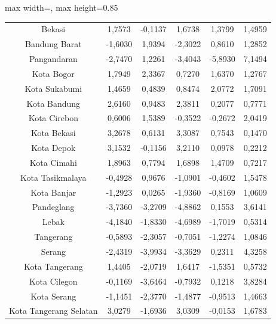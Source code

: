 \begin{table}[H]
\begin{adjustbox}{max width=\textwidth, max height=0.85\textheight}
\begin{tabular}{|c|c|c|c|c|c|}
Bekasi & 1,7573 & -0,1137 & 1,6738 & 1,3799 & 1,4959 \\
Bandung Barat & -1,6030 & 1,9394 & -2,3022 & 0,8610 & 1,2852 \\
Pangandaran & -2,7470 & 1,2261 & -3,4043 & -5,8930 & 7,1494 \\
Kota Bogor & 1,7949 & 2,3367 & 0,7270 & 1,6370 & 1,2767 \\
Kota Sukabumi & 1,4659 & 0,4839 & 0,8474 & 2,0772 & 1,7091 \\
Kota Bandung & 2,6160 & 0,9483 & 2,3811 & 0,2077 & 0,7771 \\
Kota Cirebon & 0,6006 & 1,5389 & -0,3522 & -0,2672 & 2,0419 \\
Kota Bekasi & 3,2678 & 0,6131 & 3,3087 & 0,7543 & 0,1470 \\
Kota Depok & 3,1532 & -0,1156 & 3,2110 & 0,0978 & 0,2212 \\
Kota Cimahi & 1,8963 & 0,7794 & 1,6898 & 1,4709 & 0,7217 \\
Kota Tasikmalaya & -0,4928 & 0,9676 & -1,0901 & -0,4602 & 1,5478 \\
Kota Banjar & -1,2923 & 0,0265 & -1,9360 & -0,8169 & 1,0609 \\
Pandeglang & -3,7360 & -3,2709 & -4,8862 & 0,1553 & 3,6141 \\
Lebak & -4,1840 & -1,8330 & -4,6989 & -1,7019 & 0,5314 \\
Tangerang & -0,5893 & -2,3057 & -0,7051 & -1,2274 & 1,0846 \\
Serang & -2,4319 & -3,9934 & -3,3629 & 0,2311 & 4,3258 \\
Kota Tangerang & 1,4405 & -2,0719 & 1,6417 & -1,5351 & 0,5732 \\
Kota Cilegon & -0,1169 & -3,6464 & -0,7932 & 0,1218 & 3,8284 \\
Kota Serang & -1,1451 & -2,3770 & -1,4877 & -0,9513 & 1,4663 \\
Kota Tangerang Selatan & 3,0279 & -1,6936 & 3,0309 & -0,0153 & 1,6783 \\
\hline
\end{tabular}
\end{adjustbox}
\end{table}